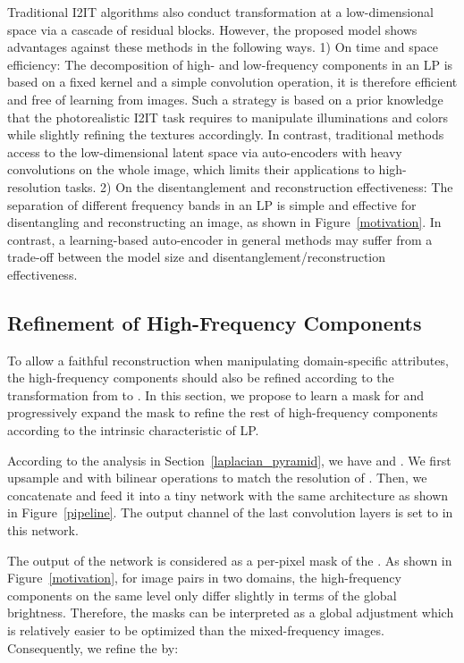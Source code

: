 \documentclass[10pt,twocolumn,letterpaper]{article}
\begin{document}
	Traditional I2IT algorithms also conduct transformation at a low-dimensional space via a cascade of residual blocks. However, the proposed model shows advantages against these methods in the following ways. 1) On time and space efficiency: The decomposition of high- and low-frequency components in an LP is based on a fixed kernel and a simple convolution operation, it is therefore efficient and free of learning from images. Such a strategy is based on a prior knowledge that the photorealistic I2IT task requires to manipulate illuminations and colors while slightly refining the textures accordingly. In contrast, traditional methods access to the low-dimensional latent space via auto-encoders with heavy convolutions on the whole image, which limits their applications to high-resolution tasks. 2) On the disentanglement and reconstruction effectiveness: The separation of different frequency bands in an LP is simple and effective for disentangling and reconstructing an image, as shown in Figure~\ref{motivation}. In contrast, a learning-based auto-encoder in general methods may suffer from a trade-off between the model size and disentanglement/reconstruction effectiveness.
		
	\subsection{Refinement of High-Frequency Components}
	
	To allow a faithful reconstruction when manipulating domain-specific attributes, the high-frequency components  should also be refined according to the transformation from  to . In this section, we propose to learn a mask for  and progressively expand the mask to refine the rest of high-frequency components according to the intrinsic characteristic of LP.
	
	According to the analysis in Section~\ref{laplacian_pyramid}, we have  and . We first upsample  and  with bilinear operations to match the resolution of . Then, we concatenate  and feed it into a tiny network with the same architecture as shown in Figure~\ref{pipeline}. The output channel of the last convolution layers is set to  in this network.
	
	The output of the network  is considered as a per-pixel mask of the . As shown in Figure~\ref{motivation}, for image pairs in two domains, the high-frequency components on the same level only differ slightly in terms of the global brightness. Therefore, the masks can be interpreted as a global adjustment which is relatively easier to be optimized than the mixed-frequency images. Consequently, we refine the  by:
	
\end{document}
